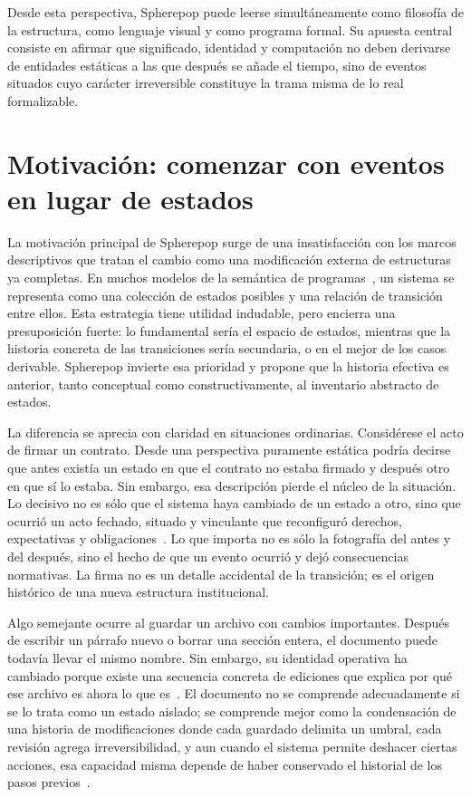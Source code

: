 \documentclass[12pt]{article}
\theoremstyle{plain}
\theoremstyle{definition}
\begin{document}
Desde esta perspectiva, Spherepop puede leerse simultáneamente como filosofía de la estructura, como lenguaje visual y como programa formal. Su apuesta central consiste en afirmar que significado, identidad y computación no deben derivarse de entidades estáticas a las que después se añade el tiempo, sino de eventos situados cuyo carácter irreversible constituye la trama misma de lo real formalizable.

\section{Motivación: comenzar con eventos en lugar de estados}
\label{sec:motivacion}

La motivación principal de Spherepop surge de una insatisfacción con los marcos descriptivos que tratan el cambio como una modificación externa de estructuras ya completas. En muchos modelos de la semántica de programas~\cite{abramsky,plotkin}, un sistema se representa como una colección de estados posibles y una relación de transición entre ellos. Esta estrategia tiene utilidad indudable, pero encierra una presuposición fuerte: lo fundamental sería el espacio de estados, mientras que la historia concreta de las transiciones sería secundaria, o en el mejor de los casos derivable. Spherepop invierte esa prioridad y propone que la historia efectiva es anterior, tanto conceptual como constructivamente, al inventario abstracto de estados.

La diferencia se aprecia con claridad en situaciones ordinarias. Considérese el acto de firmar un contrato. Desde una perspectiva puramente estática podría decirse que antes existía un estado en que el contrato no estaba firmado y después otro en que sí lo estaba. Sin embargo, esa descripción pierde el núcleo de la situación. Lo decisivo no es sólo que el sistema haya cambiado de un estado a otro, sino que ocurrió un acto fechado, situado y vinculante que reconfiguró derechos, expectativas y obligaciones~\cite{searle,austin}. Lo que importa no es sólo la fotografía del antes y del después, sino el hecho de que un evento ocurrió y dejó consecuencias normativas. La firma no es un detalle accidental de la transición; es el origen histórico de una nueva estructura institucional.

Algo semejante ocurre al guardar un archivo con cambios importantes. Después de escribir un párrafo nuevo o borrar una sección entera, el documento puede todavía llevar el mismo nombre. Sin embargo, su identidad operativa ha cambiado porque existe una secuencia concreta de ediciones que explica por qué ese archivo es ahora lo que es~\cite{chacon}. El documento no se comprende adecuadamente si se lo trata como un estado aislado; se comprende mejor como la condensación de una historia de modificaciones donde cada guardado delimita un umbral, cada revisión agrega irreversibilidad, y aun cuando el sistema permite deshacer ciertas acciones, esa capacidad misma depende de haber conservado el historial de los pasos previos~\cite{okasaki}.
\end{document}
